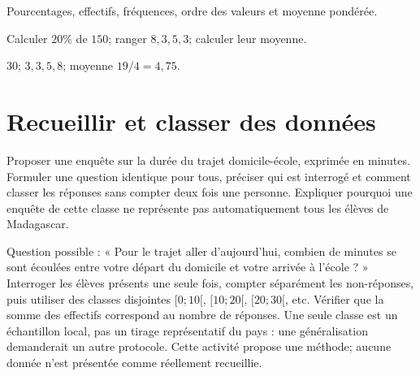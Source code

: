 \label{t11s-c18}
\begin{revision}Pourcentages, effectifs, fréquences, ordre des valeurs et moyenne pondérée.\end{revision}
\begin{automatismes}\exo\label{t11s-c18-auto}Calculer $20\%$ de $150$; ranger $8,3,5,3$; calculer leur moyenne.\end{automatismes}
\begin{corrige}\label{sol-t11s-c18-auto}$30$; $3,3,5,8$; moyenne $19/4=4{,}75$.\end{corrige}

\section{Recueillir et classer des données}
\begin{situation}
\exo\label{t11s-c18-act}Proposer une enquête sur la durée du trajet domicile-école, exprimée en minutes. Formuler une question identique pour tous, préciser qui est interrogé et comment classer les réponses sans compter deux fois une personne. Expliquer pourquoi une enquête de cette classe ne représente pas automatiquement tous les élèves de Madagascar.
\end{situation}
\begin{corrige}\label{sol-t11s-c18-act}
Question possible : « Pour le trajet aller d’aujourd’hui, combien de minutes se sont écoulées entre votre départ du domicile et votre arrivée à l’école ? » Interroger les élèves présents une seule fois, compter séparément les non-réponses, puis utiliser des classes disjointes $[0;10[$, $[10;20[$, $[20;30[$, etc. Vérifier que la somme des effectifs correspond au nombre de réponses. Une seule classe est un échantillon local, pas un tirage représentatif du pays : une généralisation demanderait un autre protocole. Cette activité propose une méthode; aucune donnée n’est présentée comme réellement recueillie.
\end{corrige}
